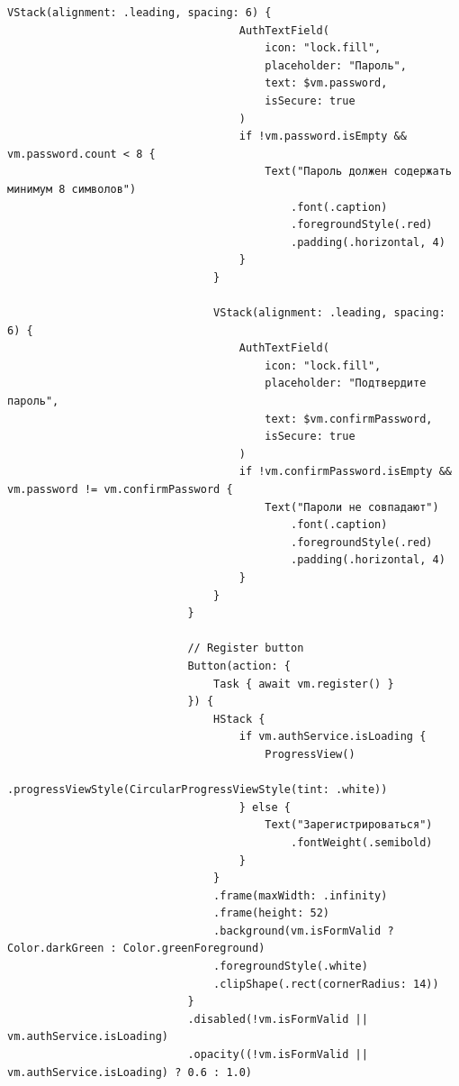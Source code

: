 \begin{lstlisting}[basicstyle=\tiny\ttfamily,breaklines=true]
                                VStack(alignment: .leading, spacing: 6) {
                                    AuthTextField(
                                        icon: "lock.fill",
                                        placeholder: "Пароль",
                                        text: $vm.password,
                                        isSecure: true
                                    )
                                    if !vm.password.isEmpty && vm.password.count < 8 {
                                        Text("Пароль должен содержать минимум 8 символов")
                                            .font(.caption)
                                            .foregroundStyle(.red)
                                            .padding(.horizontal, 4)
                                    }
                                }

                                VStack(alignment: .leading, spacing: 6) {
                                    AuthTextField(
                                        icon: "lock.fill",
                                        placeholder: "Подтвердите пароль",
                                        text: $vm.confirmPassword,
                                        isSecure: true
                                    )
                                    if !vm.confirmPassword.isEmpty && vm.password != vm.confirmPassword {
                                        Text("Пароли не совпадают")
                                            .font(.caption)
                                            .foregroundStyle(.red)
                                            .padding(.horizontal, 4)
                                    }
                                }
                            }

                            // Register button
                            Button(action: {
                                Task { await vm.register() }
                            }) {
                                HStack {
                                    if vm.authService.isLoading {
                                        ProgressView()
                                            .progressViewStyle(CircularProgressViewStyle(tint: .white))
                                    } else {
                                        Text("Зарегистрироваться")
                                            .fontWeight(.semibold)
                                    }
                                }
                                .frame(maxWidth: .infinity)
                                .frame(height: 52)
                                .background(vm.isFormValid ? Color.darkGreen : Color.greenForeground)
                                .foregroundStyle(.white)
                                .clipShape(.rect(cornerRadius: 14))
                            }
                            .disabled(!vm.isFormValid || vm.authService.isLoading)
                            .opacity((!vm.isFormValid || vm.authService.isLoading) ? 0.6 : 1.0)


\end{lstlisting}

